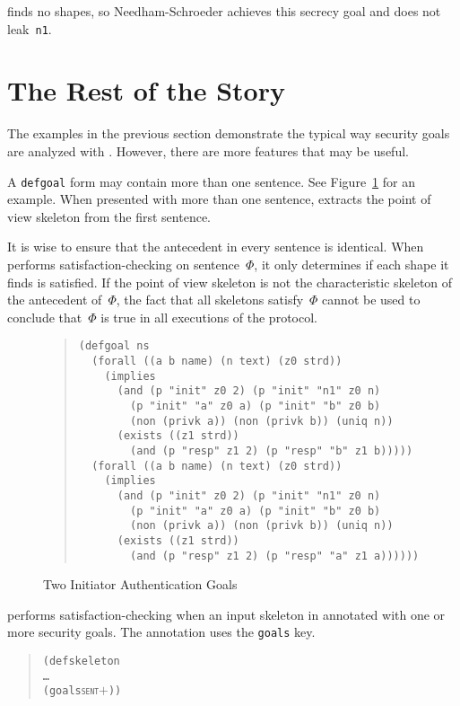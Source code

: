 \documentclass[12pt]{article}
\begin{document}
{\cpsa} finds no shapes, so Needham-Schroeder achieves this secrecy
goal and does not leak~\texttt{n1}.

\section{The Rest of the Story}\label{sec:whole story}

The examples in the previous section demonstrate the typical way
security goals are analyzed with {\cpsa}.  However, there are more
features that may be useful.

A \texttt{defgoal} form may contain more than one sentence.  See
Figure~\ref{fig:ns init goals} for an example.  When presented with
more than one sentence, {\cpsa} extracts the point of view skeleton
from the first sentence.

It is wise to ensure that the antecedent in every sentence is
identical.  When {\cpsa} performs satisfaction-checking on
sentence~$\Phi$, it only determines if each shape it finds is
satisfied.  If the point of view skeleton is not the characteristic
skeleton of the antecedent of~$\Phi$, the fact that all skeletons
satisfy~$\Phi$ cannot be used to conclude that~$\Phi$ is true in all
executions of the protocol.

\begin{figure}
\begin{quote}
\begin{verbatim}
(defgoal ns
  (forall ((a b name) (n text) (z0 strd))
    (implies
      (and (p "init" z0 2) (p "init" "n1" z0 n)
        (p "init" "a" z0 a) (p "init" "b" z0 b)
        (non (privk a)) (non (privk b)) (uniq n))
      (exists ((z1 strd))
        (and (p "resp" z1 2) (p "resp" "b" z1 b)))))
  (forall ((a b name) (n text) (z0 strd))
    (implies
      (and (p "init" z0 2) (p "init" "n1" z0 n)
        (p "init" "a" z0 a) (p "init" "b" z0 b)
        (non (privk a)) (non (privk b)) (uniq n))
      (exists ((z1 strd))
        (and (p "resp" z1 2) (p "resp" "a" z1 a))))))
\end{verbatim}
\end{quote}
\caption{Two Initiator Authentication Goals}\label{fig:ns init goals}
\end{figure}

{\cpsa} performs satisfaction-checking when an input skeleton in annotated
with one or more security goals.  The annotation uses the
\texttt{goals} key.

\begin{quote}
  \begin{alltt}
(defskeleton
   \ldots
   (goals \textsc{sent\ensuremath{+}}))
  \end{alltt}
\end{quote}
\end{document}
